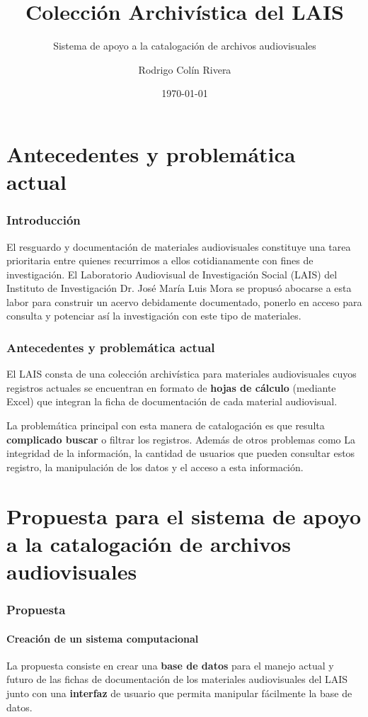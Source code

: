 \documentclass{beamer}
\title{Colección Archivística del LAIS}
\subtitle{Sistema de apoyo a la catalogación de archivos audiovisuales}
\author{Rodrigo Colín Rivera}
\institute
{
  Laboratorio Audiovisual de Investigación Social\\
  Instituto de Investigaciones Dr. José María Luis Mora
}
\date{\today}
\begin{document}
\frame{\titlepage} %

\section{Antecedentes y problemática actual}
\begin{frame}
	\frametitle{Introducción}
	El resguardo y documentación de materiales audiovisuales constituye una tarea prioritaria entre quienes recurrimos a ellos cotidianamente con fines de investigación. El Laboratorio Audiovisual de Investigación Social (LAIS) del Instituto de Investigación Dr. José María Luis Mora se propusó abocarse a esta labor para construir un acervo debidamente documentado, ponerlo en acceso para consulta y potenciar así la investigación con este tipo de materiales.
\end{frame}

\begin{frame}
	\frametitle{Antecedentes y problemática actual}
	El LAIS consta de una colección archivística para materiales audiovisuales cuyos registros actuales se encuentran en formato de \textbf{hojas de cálculo} (mediante Excel) que integran la ficha de documentación de cada material audiovisual.
	
	La problemática principal con esta manera de catalogación es que resulta \textbf{complicado buscar} o filtrar los registros. Además de otros problemas como La integridad de la información, la cantidad de usuarios que pueden consultar estos registro, la manipulación de los datos y el acceso a esta información.
\end{frame}

\section{Propuesta para el sistema de apoyo a la catalogación de archivos audiovisuales}
\begin{frame}
	\frametitle{Propuesta}
	\framesubtitle{Creación de un sistema computacional}
	
	La propuesta consiste en crear una \textbf{base de datos} para el manejo actual y futuro de las fichas de documentación de los materiales audiovisuales del LAIS junto con una \textbf{interfaz} de usuario que permita manipular fácilmente la base de datos.
\end{frame}
\end{document}
